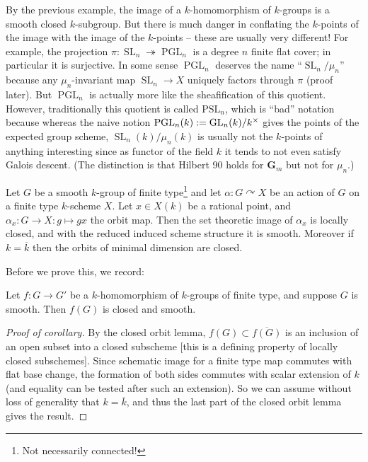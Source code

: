 \documentclass[10pt]{article}
\newcommand{\GL}{\operatorname{GL}}
\newcommand{\PGL}{\operatorname{PGL}}
\newcommand{\SL}{\operatorname{SL}}
\renewcommand{\(}{\left(}
\renewcommand{\)}{\right)}
\renewcommand{\bar}{\overline}
\newcommand{\actson}{\curvearrowright}
\newcommand{\onto}{\twoheadrightarrow }
\numberwithin{thm}{subsection}
\begin{document}
\begin{rem}
By the previous example, the image of a $k$-homomorphism of $k$-groups is
a smooth closed $k$-subgroup. But there is much danger in conflating the $k$-points
of the image with the image of the $k$-points -- these are usually very different!
For example, the projection $\pi:\SL_n\onto \PGL_n$
is a degree $n$ finite flat cover; in particular it is surjective.
In some sense $\PGL_n$ deserves the name ``$\SL_n/\mu_n$'' because
any $\mu_n$-invariant map $\SL_n\to X$ uniquely factors through $\pi$ (proof later).
But $\PGL_n$ is actually more like the sheafification of this quotient.
However, traditionally this quotient is called $\mathrm{PSL}_n$,
which is ``bad'' notation because whereas the naive notion
${\rm{PGL}}_n(k) := \GL_n(k)/k^{\times}$ gives the points
of the expected group scheme,
$\SL_n(k)/\mu_n(k)$ is usually not the $k$-points of anything interesting
since as functor of the field $k$ it tends to not even satisfy Galois descent.  (The distinction
is that Hilbert 90 holds for $\mathbf{G}_m$ but not for $\mu_n$.) 
\end{rem}
\begin{thm}\label{closedorbit}
Let $G$ be a smooth $k$-group of finite type\footnote{Not necessarily connected!}
and let $\alpha:G\actson X$ be an action of $G$ on a finite type $k$-scheme $X$.
Let $x\in X(k)$ be a rational point,
and $\alpha_x:G\to X:g\mapsto gx$ the orbit map.
Then the set theoretic image of $\alpha_x$ is locally closed, and with the reduced
induced scheme structure it is smooth.
Moreover if $k=\bar k$ then the orbits of minimal dimension are closed.
\end{thm}

Before we prove this, we record:

\begin{cor}\label{closedorbitcor}
Let $f:G\to G'$ be a $k$-homomorphism of $k$-groups of finite type, and suppose $G$ is smooth.
Then $f(G)$ is closed and smooth.
\end{cor}
\begin{proof}[Proof of corollary]
By the closed orbit lemma, $f(G)\subset \bar{f(G)}$ is an inclusion of an open subset into 
a closed subscheme 
[this is a defining property of locally closed subschemes].
Since schematic image for a finite type map commutes with flat base change,
 the formation of both sides
commutes with scalar extension of $k$ (and equality can be tested after such an extension). 
So we can assume without loss of generality that  $k=\bar k$,
and thus the last part of the closed orbit lemma
gives the result.
\end{proof}
\end{document}
